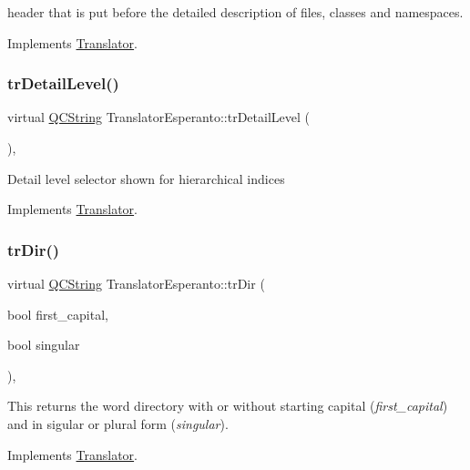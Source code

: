header that is put before the detailed description of files, classes and namespaces. 

Implements \mbox{\hyperlink{class_translator}{Translator}}.

\mbox{\label{class_translator_esperanto_a10ec6d7d10dc3bd98166c17b831f9264}} 
\subsubsection{\texorpdfstring{trDetailLevel()}{trDetailLevel()}}
{\footnotesize\ttfamily virtual \mbox{\hyperlink{class_q_c_string}{Q\+C\+String}} Translator\+Esperanto\+::tr\+Detail\+Level (\begin{DoxyParamCaption}{ }\end{DoxyParamCaption})\hspace{0.3cm}{\ttfamily [inline]}, {\ttfamily [virtual]}}

Detail level selector shown for hierarchical indices 

Implements \mbox{\hyperlink{class_translator}{Translator}}.

\mbox{\label{class_translator_esperanto_af611cf5731a4cfea37726f1018ee9002}} 
\subsubsection{\texorpdfstring{trDir()}{trDir()}}
{\footnotesize\ttfamily virtual \mbox{\hyperlink{class_q_c_string}{Q\+C\+String}} Translator\+Esperanto\+::tr\+Dir (\begin{DoxyParamCaption}\item[{bool}]{first\+\_\+capital,  }\item[{bool}]{singular }\end{DoxyParamCaption})\hspace{0.3cm}{\ttfamily [inline]}, {\ttfamily [virtual]}}

This returns the word directory with or without starting capital ({\itshape first\+\_\+capital}) and in sigular or plural form ({\itshape singular}). 

Implements \mbox{\hyperlink{class_translator}{Translator}}.

